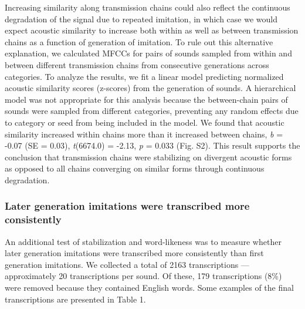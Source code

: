 \documentclass[english,floatsintext,man]{apa6}
\theoremstyle{definition}
\theoremstyle{definition}
\theoremstyle{remark}
\begin{document}
Increasing similarity along transmission chains could also reflect the
continuous degradation of the signal due to repeated imitation, in which
case we would expect acoustic similarity to increase both within as well
as between transmission chains as a function of generation of imitation.
To rule out this alternative explanation, we calculated MFCCs for pairs
of sounds sampled from within and between different transmission chains
from consecutive generations across categories. To analyze the results,
we fit a linear model predicting normalized acoustic similarity scores
(z-scores) from the generation of sounds. A hierarchical model was not
appropriate for this analysis because the between-chain pairs of sounds
were sampled from different categories, preventing any random effects
due to category or seed from being included in the model. We found that
acoustic similarity increased within chains more than it increased
between chains, \emph{b} = -0.07 (SE = 0.03), \emph{t}(6674.0) = -2.13,
\emph{p} = 0.033 (Fig. S2). This result supports the conclusion that
transmission chains were stabilizing on divergent acoustic forms as
opposed to all chains converging on similar forms through continuous
degradation.

\subsubsection{Later generation imitations were transcribed more
consistently}\label{later-generation-imitations-were-transcribed-more-consistently}

An additional test of stabilization and word-likeness was to measure
whether later generation imitations were transcribed more consistently
than first generation imitations. We collected a total of 2163
transcriptions --- approximately 20 transcriptions per sound. Of these,
179 transcriptions (8\%) were removed because they contained English
words. Some examples of the final transcriptions are presented in Table
1.
\end{document}
